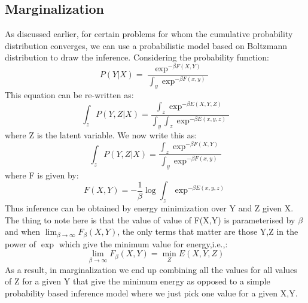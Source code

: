 \subsection{Marginalization}
As discussed earlier, for certain problems for whom the cumulative probability distribution converges,  we can use a probabilistic model based on Boltzmann distribution to draw the inference.
Considering the probability function:
\begin{equation}
    P(Y|X) = \dfrac{\exp^{-\beta F(X, Y)}}{\int_{y}\exp^{-\beta F(x,y)}}
\end{equation}
This equation can be re-written as:
\begin{equation}
    \int_{z}P(Y,Z|X) = \dfrac{\int_{z} \exp^{-\beta E(X,Y,Z)}}{\int_{y}\int_{z}\exp^{-\beta E(x,y,z)}}
\end{equation}
where Z is the latent variable. We now write this as:
\begin{equation}
    \int_{z}P(Y,Z|X) = \dfrac{\int_{z} \exp^{-\beta F(X,Y)}}{\int_{y}\exp^{-\beta F(x,y)}}
\end{equation}
where F is given by:
\begin{equation}
    F(X,Y) = -\dfrac{1}{\beta} \log \int_{z}\exp^{-\beta E(x,y,z)}
\end{equation}
Thus inference can be obtained by energy minimization over Y and Z given X.
The thing to note here is that the value of value of F(X,Y) is parameterised by $\beta$ and when $\lim_{\beta \to\infty} F_{\beta}(X,Y)$, the only terms that matter are those Y,Z in the power of $\exp$ which give the minimum value for energy,i.e.,:
\begin{equation}
    \lim_{\beta \to\infty} F_{\beta}(X,Y) = \min_{Z} E(X,Y,Z)
\end{equation}
As a result, in marginalization we end up combining all the values for all values of Z for a given Y that give the minimum energy as opposed to a simple probability based inference model where we just pick one value for a given X,Y.


